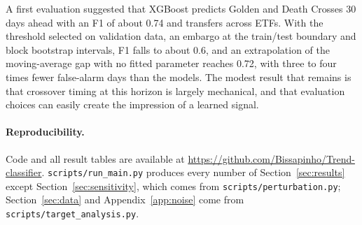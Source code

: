 \documentclass[11pt,a4paper]{article}
\begin{document}
A first evaluation suggested that XGBoost predicts Golden and Death Crosses 30 days ahead with an
F1 of about 0.74 and transfers across ETFs. With the threshold selected on validation data, an
embargo at the train/test boundary and block bootstrap intervals, F1 falls to about 0.6, and an
extrapolation of the moving-average gap with no fitted parameter reaches 0.72, with three to four
times fewer false-alarm days than the models. The modest result that
remains is that crossover timing at this horizon is largely mechanical, and that evaluation
choices can easily create the impression of a learned signal.

\paragraph{Reproducibility.} Code and all result tables are available at
\url{https://github.com/Bissapinho/Trend-classifier}. \texttt{scripts/run\_main.py} produces every number of
Section~\ref{sec:results} except Section~\ref{sec:sensitivity}, which comes from
\texttt{scripts/perturbation.py}; Section~\ref{sec:data} and Appendix~\ref{app:noise} come from
\texttt{scripts/target\_analysis.py}.
\end{document}
